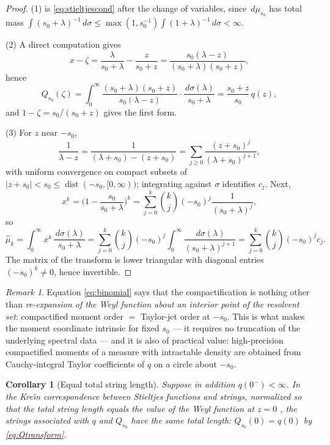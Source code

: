 \documentclass[11pt]{amsart}
\newtheorem{corollary}[theorem]{Corollary}
\theoremstyle{definition}
\theoremstyle{remark}
\newtheorem{remark}[theorem]{Remark}
\newcommand{\dd}{\,d}
\newcommand{\muh}{\widehat{\mu}}
\begin{document}
\begin{proof}
(1) is \eqref{eq:stieltjescond} after the change of variables, since
$\dd\mu_{s_0}$ has total mass $\int (s_0+\lambda)^{-1}\dd\sigma\le
\max(1,s_0^{-1})\int(1+\lambda)^{-1}\dd\sigma<\infty$.

(2) A direct computation gives
\[
x-\zeta=\frac{\lambda}{s_0+\lambda}-\frac{z}{s_0+z}
=\frac{s_0(\lambda-z)}{(s_0+\lambda)(s_0+z)} ,
\]
hence
\[
Q_{s_0}(\zeta)
=\int_0^\infty\frac{(s_0+\lambda)(s_0+z)}{s_0(\lambda-z)}
\cdot\frac{\dd\sigma(\lambda)}{s_0+\lambda}
=\frac{s_0+z}{s_0}\,q(z),
\]
and $1-\zeta=s_0/(s_0+z)$ gives the first form.

(3) For $z$ near $-s_0$,
\[
\frac1{\lambda-z}=\frac1{(\lambda+s_0)-(z+s_0)}
=\sum_{j\ge0}\frac{(z+s_0)^j}{(\lambda+s_0)^{j+1}},
\]
with uniform convergence on compact subsets of $|z+s_0|<s_0\le
\operatorname{dist}(-s_0,[0,\infty))$; integrating against $\sigma$
identifies $c_j$. Next,
\[
x^k=\Big(1-\frac{s_0}{s_0+\lambda}\Big)^{k}
=\sum_{j=0}^k\binom kj(-s_0)^j\frac1{(s_0+\lambda)^j},
\]
so
\[
\muh_k=\int_0^\infty x^k\,\frac{\dd\sigma(\lambda)}{s_0+\lambda}
=\sum_{j=0}^k\binom kj(-s_0)^j
\int_0^\infty\frac{\dd\sigma(\lambda)}{(s_0+\lambda)^{j+1}}
=\sum_{j=0}^k\binom kj(-s_0)^jc_j .
\]
The matrix of the transform is lower triangular with diagonal entries
$(-s_0)^k\ne0$, hence invertible.
\end{proof}

\begin{remark}
Equation \eqref{eq:binomial} says that the compactification is nothing other
than \emph{re-expansion of the Weyl function about an interior point of the
resolvent set}: compactified moment order $=$ Taylor-jet order at $-s_0$. This
is what makes the moment coordinate intrinsic for fixed $s_0$ --- it requires
no truncation of the underlying spectral data --- and it is also of practical
value: high-precision compactified moments of a measure with intractable
density are obtained from Cauchy-integral Taylor coefficients of $q$ on a
circle about $-s_0$.
\end{remark}

\begin{corollary}[Equal total string length]\label{cor:length}
Suppose in addition $q(0^-)<\infty$. In the Kre\u{\i}n correspondence between
Stieltjes functions and strings, normalized so that the total string length
equals the value of the Weyl function at $z=0$ \cite{KacKrein}, the strings
associated with $q$ and $Q_{s_0}$ have the same total length:
$Q_{s_0}(0)=q(0)$ by \eqref{eq:Qtransform}.
\end{corollary}
\end{document}
